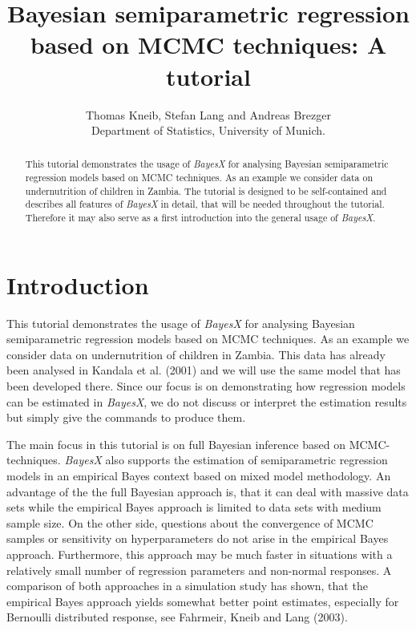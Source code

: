 \documentclass{article}
\begin{document}
\title{Bayesian semiparametric regression based on MCMC techniques: A tutorial}
\author{Thomas Kneib, Stefan Lang and Andreas Brezger\\ [.25cm]
\normalsize Department of Statistics, University of Munich. }
\maketitle

\begin{abstract}
This tutorial demonstrates the usage of {\it BayesX} for analysing
Bayesian semiparametric regression models based on MCMC
techniques. As an example we consider data on undernutrition of
children in Zambia. The tutorial is designed to be self-contained
and describes all features of {\it BayesX} in detail, that will be
needed throughout the tutorial. Therefore it may also serve as a
first introduction into the general usage of {\em BayesX}.
\end{abstract}

\tableofcontents

\newpage
\section{Introduction}\label{data}

This tutorial demonstrates the usage of {\it BayesX} for analysing
Bayesian semiparametric regression models based on MCMC
techniques. As an example we consider data on undernutrition of
children in Zambia. This data has already been analysed in Kandala
et al. (2001) \nocite{kanlan01} and we will use the same model
that has been developed there. Since our focus is on demonstrating
how regression models can be estimated in {\em BayesX}, we do not
discuss or interpret the estimation results but simply give the
commands to produce them.

The main focus in this tutorial is on full Bayesian inference
based on MCMC-techniques. {\it BayesX} also supports the
estimation of semiparametric regression models in an empirical
Bayes context based on mixed model methodology. An advantage of
the the full Bayesian approach is, that it can deal with massive
data sets while the empirical Bayes approach is limited to data
sets with medium sample size. On the other side, questions about
the convergence of MCMC samples or sensitivity on hyperparameters
do not arise in the empirical Bayes approach. Furthermore, this
approach may be much faster in situations with a relatively small
number of regression parameters and non-normal responses. A
comparison of both approaches in a simulation study has shown,
that the empirical Bayes approach yields somewhat better point
estimates, especially for Bernoulli distributed response, see
Fahrmeir, Kneib and Lang (2003).\nocite{fahkne03}
\end{document}
